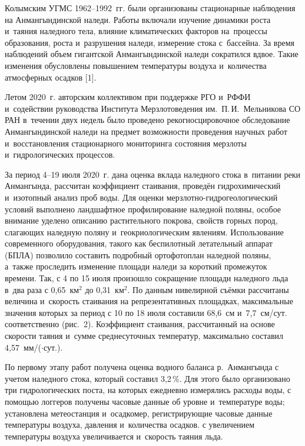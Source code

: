 Колымским УГМС 1962--1992~гг. были организованы стационарные наблюдения на Анмангындинской наледи. Работы включали изучение динамики роста и~таяния наледного тела, влияние климатических факторов на~процессы образования, роста и~разрушения наледи, измерение стока с~бассейна. За время наблюдений объем гигантской Анмангындинской наледи сократился вдвое. Такие изменения обусловлены повышением температуры воздуха и~количества атмосферных осадков [1].

Летом 2020~г. авторским коллективом при поддержке РГО и~РФФИ и~содействии руководства Института Мерзлотоведения им.~П.\,И.~Мельникова СО РАН в~течении двух недель было проведено рекогносцировочное обследование Анмангындинской наледи на предмет возможности проведения научных работ и~восстановления стационарного мониторинга состояния мерзлоты и~гидрологических процессов.

За период 4--19 июля 2020~г. дана оценка вклада наледного стока в~питании реки Анмангында, рассчитан коэффициент стаивания, проведён гидрохимический и~изотопный анализ проб воды. Для оценки мерзлотно-гидрогеологический условий выполнено ландшафтное профилирование наледной поляны, особое внимание уделено описанию растительного покрова, свойств горных пород, слагающих наледную поляну и~геокриологическим явлениям. Использование современного оборудования, такого как беспилотный летательный аппарат (БПЛА) позволило составить подробный ортофотоплан наледной поляны, а~также проследить изменение площади наледи за короткий промежуток времени. Так, с 4 по 15 июля произошло сокращение площади наледного льда в~два раза с 0,65~км$^2$ до 0,31~км$^2$. По данным нивелирной съёмки рассчитаны величина и~скорость стаивания на репрезентативных площадках, максимальные значения которых за период с 10 по 18 июля составили 68,6~см и~7,7~см/сут. соответственно (рис.~2). Коэффициент стаивания, рассчитанный на основе скорости таяния и~сумме среднесуточных температур, максимально составил 4,57~мм/(\dgc$\cdot$сут.).



По первому этапу работ получена оценка водного баланса р.~Анмангында с учетом наледного стока, который составил 3,2\,\%. Для этого было организовано три гидрологических поста, на которых ежедневно измерялись расходы воды, с помощью логгеров получены часовые данные об уровне и~температуре воды; установлена метеостанция и~осадкомер, регистрирующие часовые данные температуры воздуха, давления и~количества осадков. с увеличением температуры воздуха увеличивается и~скорость таяния льда.

